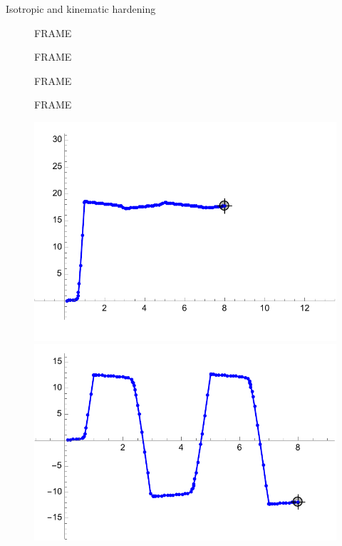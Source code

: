 \documentclass[aspectratio=169,xcolor=dvipsnames]{beamer}
\begin{document}
\begin{frame}{Isotropic and kinematic hardening}
\begin{figure}
\begin{minipage}{0.6\linewidth}
		\begin{minipage}{0.5\linewidth}
			\centering
			FRAME
		\end{minipage}\hfill
		\begin{minipage}{0.5\linewidth}
			\centering
			FRAME
		\end{minipage}\hfill
	\begin{minipage}{0.5\linewidth}
		\centering
		FRAME
	\end{minipage}\hfill
	\begin{minipage}{0.5\linewidth}
		\centering
		FRAME
	\end{minipage}\hfill
				\begin{minipage}{0.5\linewidth}
			\centering
			\includegraphics[width=\linewidth]{cook_isotropic_v.pdf}
				\end{minipage}\hfill
				\begin{minipage}{0.5\linewidth}
				\centering
				\includegraphics[width=\linewidth]{cook_kinematic_v.pdf}
			\end{minipage}\hfill
		\end{minipage}\hfill
	\end{figure}
\end{frame}
\end{document}
